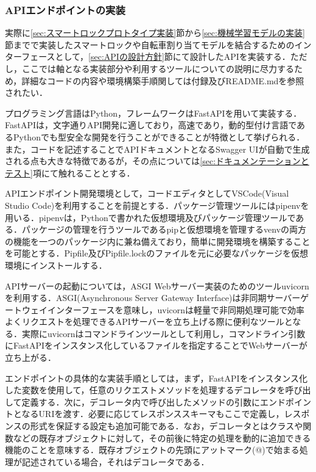       \subsubsection{APIエンドポイントの実装}
        \label{sec:APIエンドポイントの実装}
          \par 実際に\ref{sec:スマートロックプロトタイプ実装}節から\ref{sec:機械学習モデルの実装}節までで実装したスマートロックや自転車割り当てモデルを結合するためのインターフェースとして，\ref{sec:APIの設計方針}節にて設計したAPIを実装する．ただし，ここでは軸となる実装部分や利用するツールについての説明に尽力するため，詳細なコードの内容や環境構築手順関しては付録及びREADME.mdを参照されたい．
          \par プログラミング言語はPython，フレームワークはFastAPIを用いて実装する．FastAPIは，文字通りAPI開発に適しており，高速であり，動的型付け言語であるPythonでも型安全な開発を行うことができることが特徴として挙げられる．また，コードを記述することでAPIドキュメントとなるSwagger UIが自動で生成される点も大きな特徴であるが，その点については\ref{sec:ドキュメンテーションとテスト}項にて触れることとする．
          \par APIエンドポイント開発環境として，コードエディタとしてVSCode(Visual Studio Code)を利用することを前提とする．パッケージ管理ツールにはpipenvを用いる．pipenvは，Pythonで書かれた仮想環境及びパッケージ管理ツールである．パッケージの管理を行うツールであるpipと仮想環境を管理するvenvの両方の機能を一つのパッケージ内に兼ね備えており，簡単に開発環境を構築することを可能とする．Pipfile及びPipfile.lockのファイルを元に必要なパッケージを仮想環境にインストールする．
          \par APIサーバーの起動については，ASGI Webサーバー実装のためのツールuvicornを利用する．ASGI(Asynchronous Server Gateway Interface)は非同期サーバーゲートウェイインターフェースを意味し，uvicornは軽量で非同期処理可能で効率よくリクエストを処理できるAPIサーバーを立ち上げる際に便利なツールとなる．実際にuvicornはコマンドラインツールとして利用し，コマンドライン引数にFastAPIをインスタンス化しているファイルを指定することでWebサーバーが立ち上がる．
          \par エンドポイントの具体的な実装手順としては，まず，FastAPIをインスタンス化した変数を使用して，任意のリクエストメソッドを処理するデコレータを呼び出して定義する．次に，デコレータ内で呼び出したメソッドの引数にエンドポイントとなるURIを渡す．必要に応じてレスポンススキーマもここで定義し，レスポンスの形式を保証する設定も追加可能である．なお，デコレータとはクラスや関数などの既存オブジェクトに対して，その前後に特定の処理を動的に追加できる機能のことを意味する．既存オブジェクトの先頭にアットマーク(@)で始まる処理が記述されている場合，それはデコレータである．
